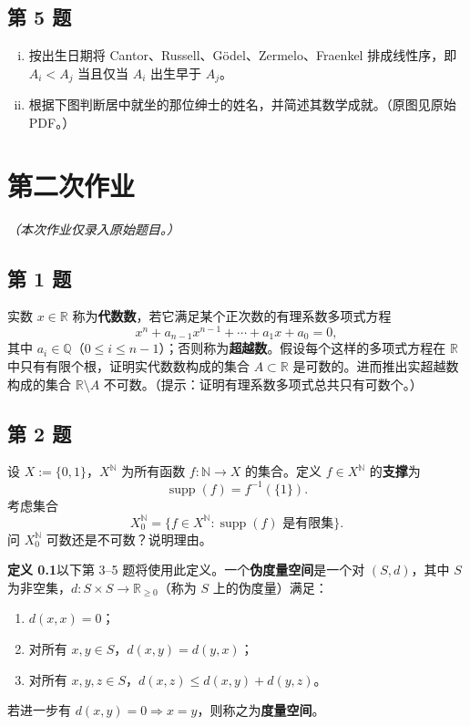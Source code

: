 \documentclass[11pt,a4paper]{article}
\newcommand{\R}{\mathbb{R}}
\newcommand{\Q}{\mathbb{Q}}
\newcommand{\N}{\mathbb{N}}
\theoremstyle{definition}
\begin{document}
\subsection{第 5 题}

\begin{enumerate}[(i)]
  \item 按出生日期将 Cantor、Russell、G\"odel、Zermelo、Fraenkel 排成线性序，即 $A_i < A_j$ 当且仅当 $A_i$ 出生早于 $A_j$。
  \item 根据下图判断居中就坐的那位绅士的姓名，并简述其数学成就。（原图见原始 PDF。）
\end{enumerate}

\section{第二次作业}

\textit{（本次作业仅录入原始题目。）}

\subsection{第 1 题}

实数 $x \in \R$ 称为\textbf{代数数}，若它满足某个正次数的有理系数多项式方程
\[
  x^n + a_{n-1}x^{n-1} + \cdots + a_1 x + a_0 = 0,
\]
其中 $a_i \in \Q$（$0 \le i \le n-1$）；否则称为\textbf{超越数}。假设每个这样的多项式方程在 $\R$ 中只有有限个根，证明实代数数构成的集合 $A \subset \R$ 是可数的。进而推出实超越数构成的集合 $\R \setminus A$ 不可数。（提示：证明有理系数多项式总共只有可数个。）

\subsection{第 2 题}

设 $X := \{0, 1\}$，$X^{\N}$ 为所有函数 $f : \N \to X$ 的集合。定义 $f \in X^{\N}$ 的\textbf{支撑}为
\[
  \operatorname{supp}(f) = f^{-1}(\{1\}).
\]
考虑集合
\[
  X_0^{\N} = \{f \in X^{\N} : \operatorname{supp}(f) \text{ 是有限集}\}.
\]
问 $X_0^{\N}$ 可数还是不可数？说明理由。

\medskip
\noindent\textbf{定义 0.1}\quad 以下第 3--5 题将使用此定义。一个\textbf{伪度量空间}是一个对 $(S, d)$，其中 $S$ 为非空集，$d : S \times S \to \R_{\ge 0}$（称为 $S$ 上的伪度量）满足：
\begin{enumerate}
  \item $d(x, x) = 0$；
  \item 对所有 $x, y \in S$，$d(x, y) = d(y, x)$；
  \item 对所有 $x, y, z \in S$，$d(x, z) \le d(x, y) + d(y, z)$。
\end{enumerate}
若进一步有 $d(x, y) = 0 \Rightarrow x = y$，则称之为\textbf{度量空间}。
\end{document}
